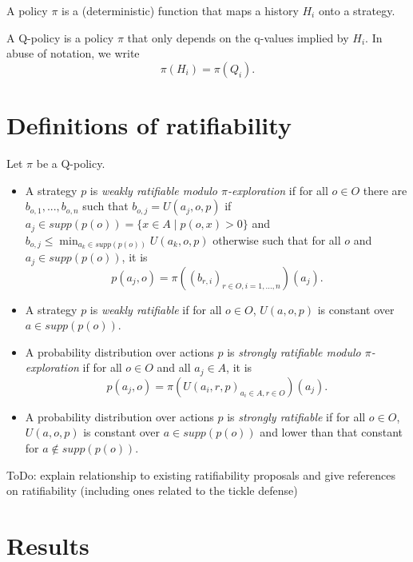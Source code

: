 \documentclass{article}
\begin{document}
A policy $\pi$ is a (deterministic) function that maps a history $H_i$ onto a strategy.

A Q-policy is a policy $\pi$ that only depends on the q-values implied by $H_i$. In abuse of notation, we write
\begin{equation}
\pi (H_i) = \pi(Q_i).
\end{equation}

\section*{Definitions of ratifiability}
Let $\pi$ be a Q-policy.
\begin{itemize}
\item A strategy $p$ is \textit{weakly ratifiable modulo $\pi$-exploration} if for all $o\in O$ there are $b_{o,1},...,b_{o,n}$ such that $b_{o,j}=U(a_j,o,p)$ if $a_j\in supp (p(o))=\{x\in A\mid p(o,x)>0 \}$ and $b_{o,j}\leq\min_{a_k\in supp (p(o)) } U(a_k,o,p)$ otherwise such that for all $o$ and $a_j\in supp (p(o))$, it is
\begin{equation}
p(a_j,o)=\pi \left( (b_{r,i})_{r\in O, i=1,...,n} \right) (a_j).
\end{equation}
\item A strategy $p$ is \textit{weakly ratifiable} if for all $o\in O$, $U(a,o,p)$ is constant over $a\in supp(p(o))$.
\item A probability distribution over actions $p$ is \textit{strongly ratifiable modulo $\pi$-exploration} if for all $o\in O$ and all $a_j\in A$, it is
\begin{equation}
p(a_j, o)=\pi (U(a_i,r,p)_{a_i\in A, r\in O}) (a_j).
\end{equation}
\item A probability distribution over actions $p$ is \textit{strongly ratifiable} if for all $o\in O$, $U(a,o, p)$ is constant over $a\in supp(p(o))$ and lower than that constant for $a\notin supp(p(o))$.
\end{itemize}

ToDo: explain relationship to existing ratifiability proposals and give references on ratifiability (including ones related to the tickle defense)

\section*{Results}
\end{document}
